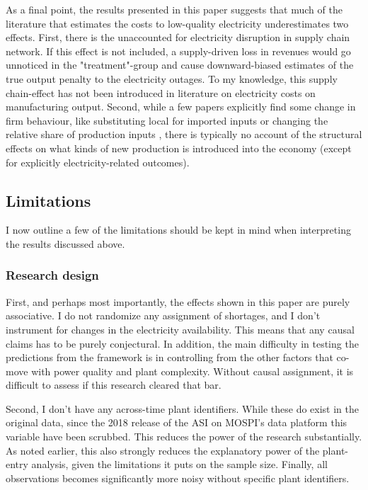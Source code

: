 \documentclass[11pt]{article}
\begin{document}
As a final point, the results presented in this paper suggests that much of the literature that estimates the costs to low-quality electricity underestimates two effects. First, there is the unaccounted for electricity disruption in supply chain network. If this effect is not included, a supply-driven loss in revenues would go unnoticed in the "treatment"-group and cause downward-biased estimates of the true output penalty to the electricity outages. To my knowledge, this supply chain-effect has not been introduced in literature on electricity costs on manufacturing output. Second, while a few papers explicitly find some change in firm behaviour, like substituting local for imported inputs \citep{fisher-vanden_electricity_2015} or changing the relative share of production inputs \citep{abeberese_electricity_2017}, there is typically no account of the structural effects on what kinds of new production is introduced into the economy (except for explicitly electricity-related outcomes).

\subsection{Limitations}
\label{sec:org979560b}
I now outline a few of the limitations should be kept in mind when interpreting the results discussed above.

\subsubsection{Research design}
First, and perhaps most importantly, the effects shown in this paper are purely associative. I do not randomize any assignment of shortages, and I don't instrument for changes in the electricity availability. This means that any causal claims has to be purely conjectural. In addition, the main difficulty in testing the predictions from the framework is in controlling from the other factors that co-move with power quality and plant complexity. Without causal assignment, it is difficult to assess if this research cleared that bar.

Second, I don't have any across-time plant identifiers. While these do exist in the original data, since the 2018 release of the ASI on MOSPI's data platform this variable have been scrubbed. This reduces the power of the research substantially. As noted earlier, this also strongly reduces the explanatory power of the plant-entry analysis, given the limitations it puts on the sample size. Finally, all observations becomes significantly more noisy without specific plant identifiers. 
\end{document}
